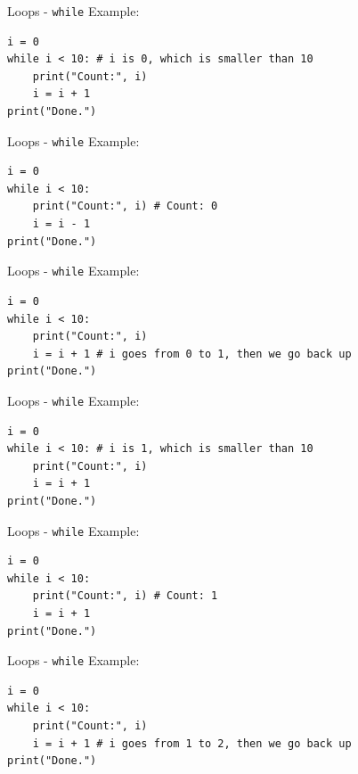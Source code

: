 \documentclass[dvipsnames, svgnames, x11names, handout]{beamer}
\begin{document}
\addtocounter{framenumber}{-1}

\begin{frame}[fragile]{Loops - \texttt{while}}
Example:
\begin{verbatim}
i = 0
while i < 10: # i is 0, which is smaller than 10
    print("Count:", i)
    i = i + 1
print("Done.")
\end{verbatim}
\end{frame}

\addtocounter{framenumber}{-1}

\begin{frame}[fragile]{Loops - \texttt{while}}
Example:
\begin{verbatim}
i = 0
while i < 10: 
    print("Count:", i) # Count: 0
    i = i - 1
print("Done.")
\end{verbatim}
\end{frame}

\addtocounter{framenumber}{-1}

\begin{frame}[fragile]{Loops - \texttt{while}}
Example:
\begin{verbatim}
i = 0
while i < 10: 
    print("Count:", i)
    i = i + 1 # i goes from 0 to 1, then we go back up
print("Done.")
\end{verbatim}
\end{frame}

\addtocounter{framenumber}{-1}

\begin{frame}[fragile]{Loops - \texttt{while}}
Example:
\begin{verbatim}
i = 0
while i < 10: # i is 1, which is smaller than 10
    print("Count:", i)
    i = i + 1
print("Done.")
\end{verbatim}
\end{frame}

\addtocounter{framenumber}{-1}

\begin{frame}[fragile]{Loops - \texttt{while}}
Example:
\begin{verbatim}
i = 0
while i < 10: 
    print("Count:", i) # Count: 1
    i = i + 1
print("Done.")
\end{verbatim}
\end{frame}

\addtocounter{framenumber}{-1}

\begin{frame}[fragile]{Loops - \texttt{while}}
Example:
\begin{verbatim}
i = 0
while i < 10: 
    print("Count:", i)
    i = i + 1 # i goes from 1 to 2, then we go back up
print("Done.")
\end{verbatim}
\end{frame}
\end{document}
